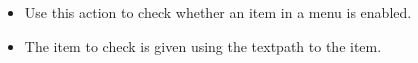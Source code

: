 
\begin{itemize}
\item Use this action to check whether an item in a menu is enabled.
\item The item to check is given using the textpath to the item. 
\end{itemize}
